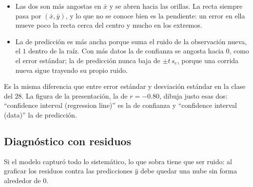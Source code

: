 \documentclass[11pt,letterpaper]{article}
\begin{document}
\begin{itemize}[itemsep=0.3em]
    \item Las dos son más angostas en $\bar{x}$ y se abren hacia las
          orillas. La recta siempre pasa por $(\bar{x}, \bar{y})$, y lo
          que no se conoce bien es la pendiente: un error en ella mueve
          poco la recta cerca del centro y mucho en los extremos.
    \item La de predicción es más ancha porque suma el ruido de la
          observación nueva, el $1$ dentro de la raíz. Con más datos la
          de confianza se angosta hacia $0$, como el error estándar; la
          de predicción nunca baja de $\pm t\, s_e$, porque una corrida
          nueva sigue trayendo su propio ruido.
\end{itemize}

Es la misma diferencia que entre error estándar y desviación estándar
en la clase del $28$. La figura de la presentación, la de $r = -0.80$,
dibuja justo esas dos: ``confidence interval (regression line)'' es la
de confianza y ``confidence interval (data)'' la de predicción.


\subsection*{Diagnóstico con residuos}

Si el modelo capturó todo lo sistemático, lo que sobra tiene que ser
ruido: al graficar los residuos contra las predicciones $\hat{y}$ debe
quedar una nube sin forma alrededor de $0$.
\end{document}
